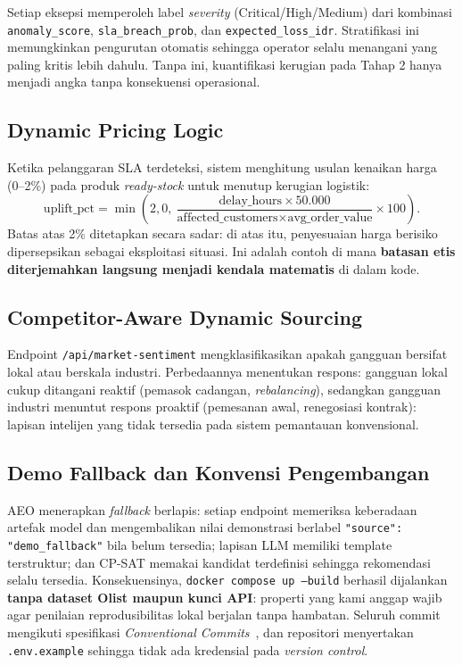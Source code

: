 \documentclass[12pt,a4paper]{article}
\begin{document}
Setiap eksepsi memperoleh label \textit{severity} (Critical/High/Medium) dari kombinasi \texttt{anomaly\_score}, \texttt{sla\_breach\_prob}, dan \texttt{expected\_loss\_idr}. Stratifikasi ini memungkinkan pengurutan otomatis sehingga operator selalu menangani yang paling kritis lebih dahulu. Tanpa ini, kuantifikasi kerugian pada Tahap 2 hanya menjadi angka tanpa konsekuensi operasional.

\subsection{Dynamic Pricing Logic}

Ketika pelanggaran SLA terdeteksi, sistem menghitung usulan kenaikan harga (0--2\%) pada produk \textit{ready-stock} untuk menutup kerugian logistik:
\[
  \text{uplift\_pct} = \min\!\left(2{,}0,\ \frac{\text{delay\_hours} \times 50.000}{\text{affected\_customers} \times \text{avg\_order\_value}} \times 100\right).
\]
Batas atas 2\% ditetapkan secara sadar: di atas itu, penyesuaian harga berisiko dipersepsikan sebagai eksploitasi situasi. Ini adalah contoh di mana \textbf{batasan etis diterjemahkan langsung menjadi kendala matematis} di dalam kode.

\subsection{Competitor-Aware Dynamic Sourcing}

Endpoint \texttt{/api/market-sentiment} mengklasifikasikan apakah gangguan bersifat lokal atau berskala industri. Perbedaannya menentukan respons: gangguan lokal cukup ditangani reaktif (pemasok cadangan, \textit{rebalancing}), sedangkan gangguan industri menuntut respons proaktif (pemesanan awal, renegosiasi kontrak): lapisan intelijen yang tidak tersedia pada sistem pemantauan konvensional.

\subsection{Demo Fallback dan Konvensi Pengembangan}

AEO menerapkan \textit{fallback} berlapis: setiap endpoint memeriksa keberadaan artefak model dan mengembalikan nilai demonstrasi berlabel \texttt{"source": "demo\_fallback"} bila belum tersedia; lapisan LLM memiliki template terstruktur; dan CP-SAT memakai kandidat terdefinisi sehingga rekomendasi selalu tersedia. Konsekuensinya, \texttt{docker compose up --build} berhasil dijalankan \textbf{tanpa dataset Olist maupun kunci API}: properti yang kami anggap wajib agar penilaian reprodusibilitas lokal berjalan tanpa hambatan. Seluruh commit mengikuti spesifikasi \textit{Conventional Commits}~\cite{convcommits}, dan repositori menyertakan \texttt{.env.example} sehingga tidak ada kredensial pada \textit{version control}.
\end{document}
